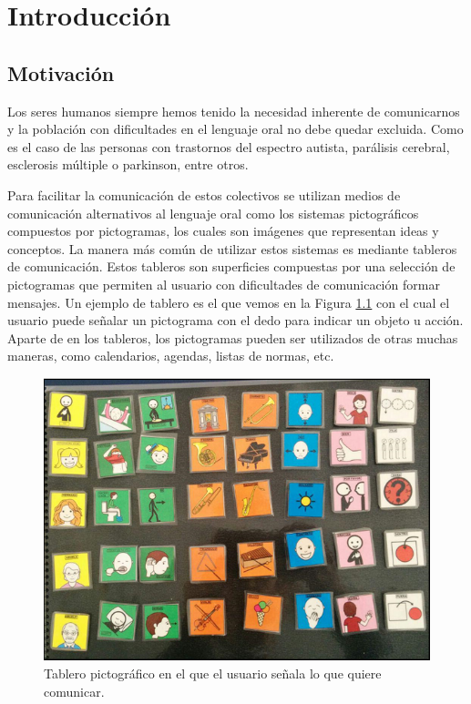 \chapter{Introducción}
\label{cap:introduccion}



\section{Motivación}
\label{cap1:sec:Motivacion}
Los seres humanos siempre hemos tenido la necesidad inherente de comunicarnos y la población con dificultades en el lenguaje oral no debe quedar excluida. Como es el caso de las personas con trastornos del espectro autista, parálisis cerebral, esclerosis múltiple o parkinson, entre otros. 

Para facilitar la comunicación de estos colectivos se utilizan medios de comunicación
alternativos al lenguaje oral como los sistemas pictográficos compuestos por pictogramas, los cuales son imágenes que representan ideas y conceptos.
La  manera más común de utilizar estos sistemas es mediante tableros de comunicación. Estos tableros son superficies  compuestas por una selección de pictogramas que permiten al usuario con dificultades de comunicación formar mensajes. Un ejemplo de tablero es el que vemos en la Figura  \ref{fig:tablerofisico}  con el cual el usuario puede señalar un pictograma con el dedo para indicar un objeto u acción. Aparte de en los tableros, los pictogramas pueden ser utilizados de otras muchas maneras, como calendarios, agendas, listas de normas, etc.


\begin{figure}[h!]
	\centering
	\includegraphics[width=0.7\linewidth]{Imagenes/Bitmap/tablerofisico}
	\caption{Tablero pictográfico en el que el usuario señala lo que quiere comunicar.}
	\label{fig:tablerofisico}
\end{figure}


